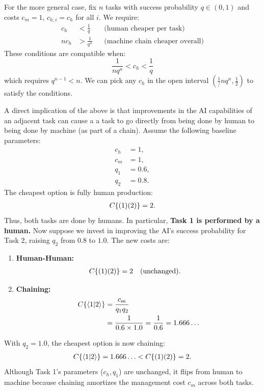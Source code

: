 \documentclass{article}
\begin{document}
For the more general case, fix $n$ tasks with success probability $q \in (0,1)$ and costs $c_m = 1$, $c_{h,i} = c_h$ for all $i$.
We require:
\begin{align*}
c_h &< \frac{1}{q} && \text{(human cheaper per task)} \\
n c_h &> \frac{1}{q^n} && \text{(machine chain cheaper overall)}
\end{align*}
These conditions are compatible when:
\[
\frac{1}{n q^n} < c_h < \frac{1}{q}
\]
which requires $q^{n-1} < n$.
We can pick any $c_h$ in the open interval $(\frac{1}/{nq^n}, \frac{1}{2})$ to satisfy the conditions.

A direct implication of the above is that improvements in the AI capabilities of an adjacent task can cause a a task to go directly from being done by human to being done by machine (as part of a chain).
Assume the following baseline parameters:
\begin{align*}
    c_h &= 1, \\
    c_m &= 1, \\
    q_1 &= 0.6, \\
    q_2 &= 0.8.
\end{align*}
The cheapest option is fully human production:\
\begin{align*}
    C\{ ( 1 )( 2 ) \} = 2.
\end{align*}
Thus, both tasks are done by humans. In particular, \textbf{Task 1 is performed by a human.}
Now suppose we invest in improving the AI's success probability for Task 2, raising $q_2$ from $0.8$ to $1.0$. The new costs are:
\begin{enumerate}
    \item \textbf{Human-Human:}
    \begin{align*}
        C\{ ( 1 )( 2 ) \} &= 2 \quad \text{(unchanged)}.
    \end{align*}
    \item \textbf{Chaining:}
    \begin{align*}
        C\{ \langle 1|2 \rangle \} &= \frac{c_m}{q_1 q_2} \\
        &= \frac{1}{0.6 \times 1.0} = \frac{1}{0.6} = 1.666\ldots
    \end{align*}
\end{enumerate}
With $q_2 = 1.0$, the cheapest option is now chaining:\
\begin{align*}
    C\{ \langle 1|2 \rangle \} = 1.666\ldots < C\{ ( 1 )( 2 ) \} = 2.
\end{align*}
Although Task 1's parameters ($c_h, q_1$) are unchanged, it flips from human to machine because chaining amortizes the management cost $c_m$ across both tasks. 
\end{document}
